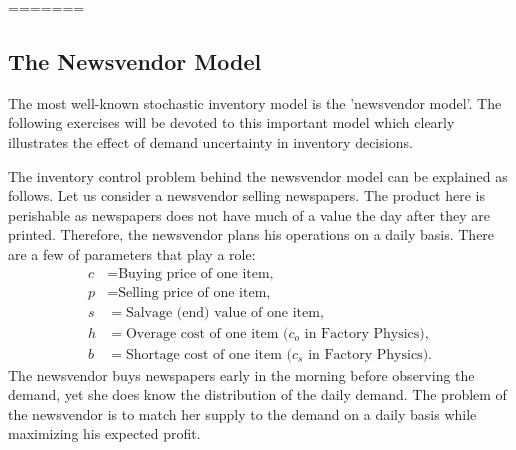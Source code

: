 %
%
%
%
=======

\subsection{The Newsvendor Model}



The most well-known stochastic inventory model is the 'newsvendor model'. The following exercises will be devoted to this important model which clearly illustrates the effect of demand uncertainty in inventory decisions. 

The inventory control problem behind the newsvendor model can be explained as follows. Let us consider a newsvendor selling newspapers. The product here is perishable as newspapers does not have much of a value the day after they are printed. Therefore, the newsvendor plans his operations on a daily basis. There are a few of parameters that play a role: 
\begin{align*}
  c &= \text{Buying price of one item,} \\
  p &= \text{Selling  price of one item,} \\
  s &= \text{Salvage (end) value of one item}, \\
  h &= \text{Overage cost of one item ($c_o$ in Factory Physics)},\\
  b &= \text{Shortage cost of one item ($c_s$ in Factory Physics)}.
\end{align*}
 The newsvendor buys newspapers early in the morning before observing the demand, yet she does know the distribution of the daily demand. The problem of the newsvendor is to match her supply to the demand on a daily basis while maximizing his expected profit.


